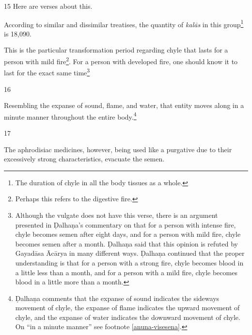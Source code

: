 \begin{translation}
\item[15] 
Here are verses about this.

\begin{sloka}
According to similar and dissimilar treatises, the quantity of \emph{kalās} in 
this group\footnote{The duration of chyle in all the body tissues as a whole.} 
is 18,090.


This is the particular transformation period regarding chyle that lasts for a person with mild fire\footnote{Perhaps this refers to the digestive fire.}. For a person with developed fire, one should know it to last for the exact same time\footnote{Although the vulgate does not have this verse, there is an argument presented in Ḍalhaṇa's commentary on  that for a person with intense fire, chyle becomes semen after eight days, and for a person with mild fire, chyle becomes semen after a month. Ḍalhaṇa said that this opinion is refuted by Gayadāsa Ācārya in many different ways. Ḍalhaṇa continued that the proper understanding is that for a person with a strong fire, chyle becomes blood in a little less than a month, and for a person 
with a mild fire, chyle becomes blood in a little more than a month.}


\end{sloka}

\item[16]

Resembling the expanse of sound, flame, and water, that entity moves
along in a minute manner throughout the  entire body.\footnote{Ḍalhaṇa
    comments \citep[63]{vulgate} that the expanse of sound indicates the
    sideways movement of chyle, the expanse of flame indicates the upward
    movement of chyle, and the expanse of water indicates the downward
    movement of chyle. On  “in a minute manner” see
    footnote \ref{anuna-visesena}.}

\item[17]

The aphrodisiac medicines, however, being used like a purgative due to their excessively strong characteristics, evacuate the semen.      


\end{translation}
